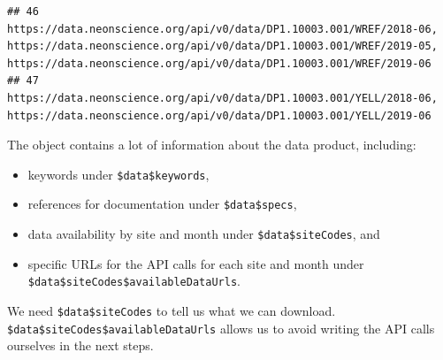 \documentclass[]{book}
\newenvironment{Shaded}{\begin{snugshade}}{\end{snugshade}}
\newcommand{\CommentTok}[1]{\textcolor[rgb]{0.56,0.35,0.01}{\textit{#1}}}
\newcommand{\KeywordTok}[1]{\textcolor[rgb]{0.13,0.29,0.53}{\textbf{#1}}}
\newcommand{\NormalTok}[1]{#1}
\newcommand{\OperatorTok}[1]{\textcolor[rgb]{0.81,0.36,0.00}{\textbf{#1}}}
\newcommand{\StringTok}[1]{\textcolor[rgb]{0.31,0.60,0.02}{#1}}
\providecommand{\tightlist}{%
  \setlength{\itemsep}{0pt}\setlength{\parskip}{0pt}}
\begin{document}
\begin{verbatim}
## 46                                                                                                                                                                                                                                                                                                                                                                                                                               https://data.neonscience.org/api/v0/data/DP1.10003.001/WREF/2018-06, https://data.neonscience.org/api/v0/data/DP1.10003.001/WREF/2019-05, https://data.neonscience.org/api/v0/data/DP1.10003.001/WREF/2019-06
## 47                                                                                                                                                                                                                                                                                                                                                                                                                                                                                                    https://data.neonscience.org/api/v0/data/DP1.10003.001/YELL/2018-06, https://data.neonscience.org/api/v0/data/DP1.10003.001/YELL/2019-06
\end{verbatim}

The object contains a lot of information about the data product, including:

\begin{itemize}
\tightlist
\item
  keywords under \texttt{\$data\$keywords},
\item
  references for documentation under \texttt{\$data\$specs},
\item
  data availability by site and month under \texttt{\$data\$siteCodes}, and
\item
  specific URLs for the API calls for each site and month under
  \texttt{\$data\$siteCodes\$availableDataUrls}.
\end{itemize}

We need \texttt{\$data\$siteCodes} to tell us what we can download.
\texttt{\$data\$siteCodes\$availableDataUrls} allows us to avoid writing the API
calls ourselves in the next steps.

\begin{Shaded}
\end{Shaded}
\end{document}
